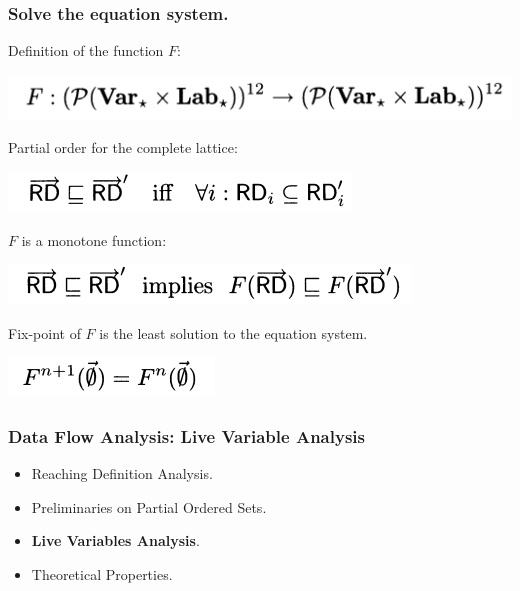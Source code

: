\documentclass[aspectratio=1610, 13pt]{beamer}
\begin{document}
\begin{frame}\frametitle{Solve the equation system.}
Definition of the function $F$:
\begin{center}
\includegraphics[scale=0.4]{rd_func.png}
\end{center}
Partial order for the complete lattice:
\begin{center}
\includegraphics[scale=0.4]{rd_cl.png}
\end{center}
$F$ is a monotone function:
\begin{center}
\includegraphics[scale=0.4]{rd_monotone.png}
\end{center}
Fix-point of $F$ is the least solution to the equation system.
\begin{center}
\includegraphics[scale=0.4]{rd_fixpoint.png}

\end{center}

\end{frame}



\begin{frame}\frametitle{Data Flow Analysis: Live Variable Analysis}
\begin{itemize}
\item Reaching Definition Analysis.
\item Preliminaries on Partial Ordered Sets.
\item \textbf{Live Variables Analysis}.
\item Theoretical Properties.


\end{itemize}
\end{frame}
\end{document}
